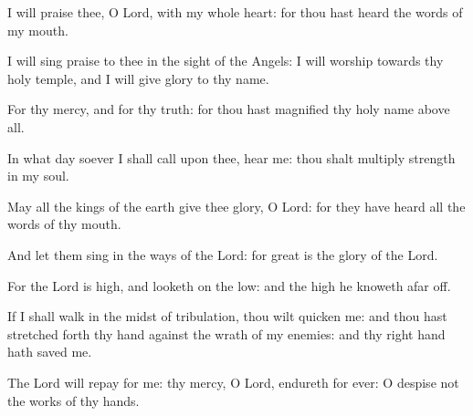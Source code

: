 \item I will praise thee, O Lord, with my whole heart: for thou hast heard the words of my mouth.
\item I will sing praise to thee in the sight of the Angels: I will worship towards thy holy temple, and I will give glory to thy name.
\item For thy mercy, and for thy truth: for thou hast magnified thy holy name above all.
\item In what day soever I shall call upon thee, hear me: thou shalt multiply strength in my soul.
\item May all the kings of the earth give thee glory, O Lord: for they have heard all the words of thy mouth.
\item And let them sing in the ways of the Lord: for great is the glory of the Lord.
\item For the Lord is high, and looketh on the low: and the high he knoweth afar off.
\item If I shall walk in the midst of tribulation, thou wilt quicken me: and thou hast stretched forth thy hand against the wrath of my enemies: and thy right hand hath saved me.
\item The Lord will repay for me: thy mercy, O Lord, endureth for ever: O despise not the works of thy hands.
